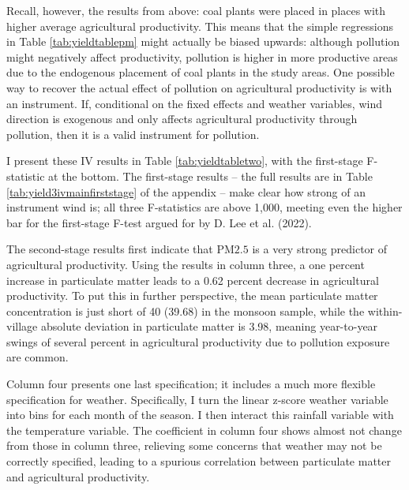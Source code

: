 \documentclass[
]{article}
\begin{document}
Recall, however, the results from above: coal plants were placed in places with higher average agricultural productivity. This means that the simple regressions in Table \ref{tab:yieldtablepm} might actually be biased upwards: although pollution might negatively affect productivity, pollution is higher in more productive areas due to the endogenous placement of coal plants in the study areas. One possible way to recover the actual effect of pollution on agricultural productivity is with an instrument. If, conditional on the fixed effects and weather variables, wind direction is exogenous and only affects agricultural productivity through pollution, then it is a valid instrument for pollution.

I present these IV results in Table \ref{tab:yieldtabletwo}, with the first-stage F-statistic at the bottom. The first-stage results -- the full results are in Table \ref{tab:yield3ivmainfirststage} of the appendix -- make clear how strong of an instrument wind is; all three F-statistics are above 1,000, meeting even the higher bar for the first-stage F-test argued for by D. Lee et al. (2022).

The second-stage results first indicate that \(\mathrm{PM 2.5}\) is a very strong predictor of agricultural productivity. Using the results in column three, a one percent increase in particulate matter leads to a 0.62 percent decrease in agricultural productivity. To put this in further perspective, the mean particulate matter concentration is just short of 40 (39.68) in the monsoon sample, while the within-village absolute deviation in particulate matter is 3.98, meaning year-to-year swings of several percent in agricultural productivity due to pollution exposure are common.

Column four presents one last specification; it includes a much more flexible specification for weather. Specifically, I turn the linear z-score weather variable into bins for each month of the season. I then interact this rainfall variable with the temperature variable. The coefficient in column four shows almost not change from those in column three, relieving some concerns that weather may not be correctly specified, leading to a spurious correlation between particulate matter and agricultural productivity.
\end{document}
